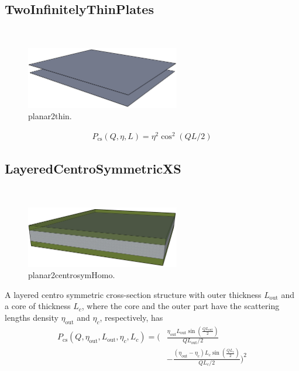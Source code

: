 \clearpage
\subsection{TwoInfinitelyThinPlates}
\label{sect:TwoInfinitelyThinPlates}
\hspace{1pt} \\
\begin{figure}[htb]
\begin{center}
\includegraphics[width=0.6\textwidth,height=0.4\textwidth]{planar2thin.png}
\end{center}
\caption{planar2thin.}
\label{fig:planar2thin}
\end{figure}
\begin{align}
P_\text{cs}(Q,\eta,L) = \eta^2 \cos^2(QL/2)
\end{align}


\clearpage
\subsection{LayeredCentroSymmetricXS}
\label{sect:LayeredCentroSymmetricXS}
~\\

\begin{figure}[htb]
\begin{center}
\includegraphics[width=0.6\textwidth,height=0.4\textwidth]{planar2centrosymm.png}
\end{center}
\caption{planar2centrosymHomo.}
\label{fig:planar2centrosymm}
\end{figure}
A layered centro symmetric cross-section structure with outer
thickness $L_\text{out}$ and a core of thickness $L_c$, where the
core and the outer part have the scattering lengths density
$\eta_\text{out}$ and $\eta_c$, respectively, has
\begin{align}
P_\text{cs}(Q,\eta_\text{out},L_\text{out},\eta_c,L_c)
= \Biggl( & \frac{\eta_\text{out}L_\text{out}\sin\left(\frac{QL_\text{out}}{2}\right)}{QL_\text{out}/2} \\
&-  \frac{(\eta_\text{out}-\eta_c)L_c\sin\left(\frac{QL_c}{2}\right)}{QL_c/2}\Biggr)^2 \nonumber
\end{align}

